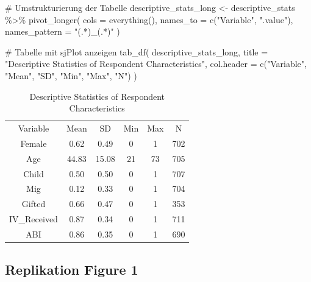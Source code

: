 \documentclass[
  letterpaper,
  DIV=11,
  numbers=noendperiod]{scrartcl}
\newenvironment{Shaded}{\begin{snugshade}}{\end{snugshade}}
\newcommand{\AttributeTok}[1]{\textcolor[rgb]{0.40,0.45,0.13}{#1}}
\newcommand{\CommentTok}[1]{\textcolor[rgb]{0.37,0.37,0.37}{#1}}
\newcommand{\FunctionTok}[1]{\textcolor[rgb]{0.28,0.35,0.67}{#1}}
\newcommand{\NormalTok}[1]{\textcolor[rgb]{0.00,0.23,0.31}{#1}}
\newcommand{\OtherTok}[1]{\textcolor[rgb]{0.00,0.23,0.31}{#1}}
\newcommand{\SpecialCharTok}[1]{\textcolor[rgb]{0.37,0.37,0.37}{#1}}
\newcommand{\StringTok}[1]{\textcolor[rgb]{0.13,0.47,0.30}{#1}}
\begin{document}
\begin{Shaded}
\begin{Highlighting}[]
\CommentTok{\# Umstrukturierung der Tabelle}
\NormalTok{descriptive\_stats\_long }\OtherTok{\textless{}{-}}\NormalTok{ descriptive\_stats }\SpecialCharTok{\%\textgreater{}\%}
  \FunctionTok{pivot\_longer}\NormalTok{(}
    \AttributeTok{cols =} \FunctionTok{everything}\NormalTok{(),}
    \AttributeTok{names\_to =} \FunctionTok{c}\NormalTok{(}\StringTok{"Variable"}\NormalTok{, }\StringTok{".value"}\NormalTok{),}
    \AttributeTok{names\_pattern =} \StringTok{"(.*)\_(.*)"}
\NormalTok{  )}

\CommentTok{\# Tabelle mit sjPlot anzeigen}
\FunctionTok{tab\_df}\NormalTok{(}
\NormalTok{  descriptive\_stats\_long,}
  \AttributeTok{title =} \StringTok{"Descriptive Statistics of Respondent Characteristics"}\NormalTok{,}
  \AttributeTok{col.header =} \FunctionTok{c}\NormalTok{(}\StringTok{"Variable"}\NormalTok{, }\StringTok{"Mean"}\NormalTok{, }\StringTok{"SD"}\NormalTok{, }\StringTok{"Min"}\NormalTok{, }\StringTok{"Max"}\NormalTok{, }\StringTok{"N"}\NormalTok{)}
\NormalTok{)}
\end{Highlighting}
\end{Shaded}

\begin{longtable}[]{@{}cccccc@{}}
\caption{Descriptive Statistics of Respondent
Characteristics}\tabularnewline
\toprule\noalign{}
\endfirsthead
\endhead
\bottomrule\noalign{}
\endlastfoot
Variable & Mean & SD & Min & Max & N \\
Female & 0.62 & 0.49 & 0 & 1 & 702 \\
Age & 44.83 & 15.08 & 21 & 73 & 705 \\
Child & 0.50 & 0.50 & 0 & 1 & 707 \\
Mig & 0.12 & 0.33 & 0 & 1 & 704 \\
Gifted & 0.66 & 0.47 & 0 & 1 & 353 \\
IV\_Received & 0.87 & 0.34 & 0 & 1 & 711 \\
ABI & 0.86 & 0.35 & 0 & 1 & 690 \\
\end{longtable}

\subsection{Replikation Figure 1}\label{replikation-figure-1}
\end{document}
